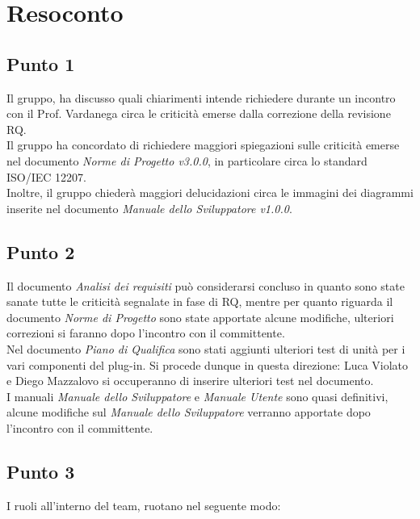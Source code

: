 \section{Resoconto}

\subsection{Punto 1}
Il gruppo, ha discusso quali chiarimenti intende richiedere durante un incontro con il Prof. Vardanega circa le criticità emerse dalla correzione della revisione RQ.\\
Il gruppo ha concordato di richiedere maggiori spiegazioni sulle criticità emerse nel documento \textit{Norme di Progetto v3.0.0}, in particolare circa lo standard ISO/IEC 12207. \\
Inoltre, il gruppo chiederà maggiori delucidazioni circa le immagini dei diagrammi inserite nel documento \textit{Manuale dello Sviluppatore v1.0.0}.

\subsection{Punto 2}
Il documento \textit{Analisi dei requisiti} può considerarsi concluso in quanto sono state sanate tutte le criticità segnalate in fase di RQ, mentre per quanto riguarda il documento \textit{Norme di Progetto} sono state apportate alcune modifiche, ulteriori correzioni si faranno dopo l'incontro con il committente.\\
Nel documento \textit{Piano di Qualifica} sono stati aggiunti ulteriori test di unità per i vari componenti del plug-in. Si procede dunque in questa direzione: Luca Violato e Diego Mazzalovo si occuperanno di inserire ulteriori test nel documento. \\
I manuali \textit{Manuale dello Sviluppatore} e \textit{Manuale Utente} sono quasi definitivi, alcune modifiche sul \textit{Manuale dello Sviluppatore} verranno apportate dopo l'incontro con il committente.
 
\newpage
\subsection{Punto 3}
I ruoli all'interno del team, ruotano nel seguente modo:\\

